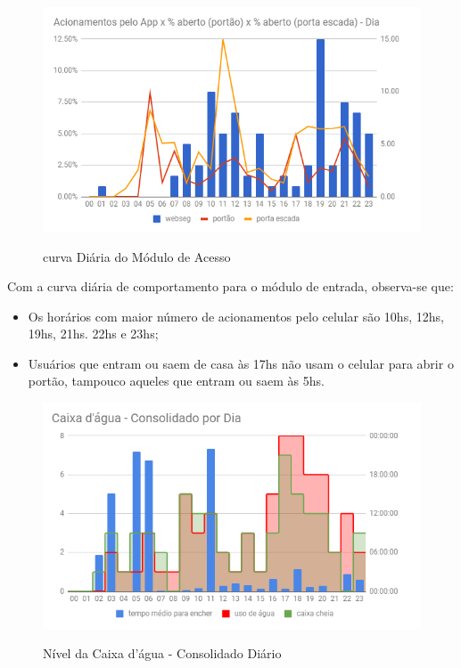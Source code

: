 \begin{figure}[H]
	\centering
	\caption{curva Diária do Módulo de Acesso}
	\includegraphics[width=1.0\textwidth]{EntradaConsolidadoDia}
	\label{fig:EntradaConsolidadoDia}
\end{figure}

Com a curva diária de comportamento para o módulo de entrada, observa-se que:

\begin{itemize}
	\item Os horários com maior número de acionamentos pelo celular são 10hs, 12hs, 19hs, 21hs. 22hs e 23hs;
	\item Usuários que entram ou saem de casa às 17hs não usam o celular para abrir o portão, tampouco aqueles que entram ou saem às 5hs.
\end{itemize}

\begin{figure}[H]
	\centering
	\caption{Nível da Caixa d'água - Consolidado Diário}
	\includegraphics[width=1.0\textwidth]{CxAguaDia}
	\label{fig:CxAguaDia}
\end{figure}

